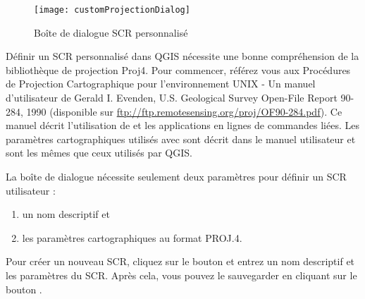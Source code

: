 \begin{figure}[ht]
   \begin{center}
    \caption{Boîte de dialogue SCR 
personnalisé\nixcaption}\label{fig:customprojections}\smallskip
   \texttt{[image: customProjectionDialog]}
\end{center}  
\end{figure}

Définir un SCR personnalisé dans QGIS nécessite une bonne
compréhension de la bibliothèque de projection Proj4. Pour commencer, référez
vous aux Procédures de Projection Cartographique pour l'environnement UNIX - Un
manuel d'utilisateur de Gerald I. Evenden, U.S. Geological Survey Open-File
Report 90-284, 1990 (disponible sur
\url{ftp://ftp.remotesensing.org/proj/OF90-284.pdf}).
Ce manuel décrit l'utilisation de  et les applications en
lignes de commandes liées. Les paramètres cartographiques utilisés avec
 sont décrit dans le manuel utilisateur et sont les mêmes que
ceux utilisés par QGIS.

La boîte de dialogue  nécessite seulement deux paramètres pour définir un 
SCR utilisateur :
\begin{enumerate}
\item un nom descriptif et
\item les paramètres cartographiques au format PROJ.4.
\end{enumerate}
Pour créer un nouveau SCR, cliquez sur le bouton  
et entrez un nom descriptif et les paramètres du SCR. Après cela, vous pouvez 
le sauvegarder en cliquant sur le bouton .

